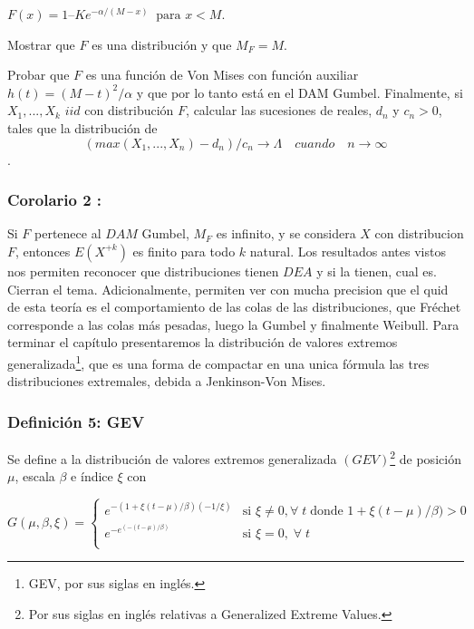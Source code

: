\documentclass[
  oneside]{article}
\begin{document}
\(F(x)= 1 – K e^{-α/(M-x)}\:\text{ para }x<M.\)

Mostrar que \(F\) es una distribución y que \(M_F= M\).

Probar que \(F\) es una función de Von Mises con función auxiliar
\(h(t)= (M-t)^2/ \alpha\) y que por lo tanto está en el DAM Gumbel.
Finalmente, si \(X_1,...,X_k\) \(iid\) con distribución \(F\), calcular
las sucesiones de reales, \(d_n\) y \(c_n>0\), tales que la distribución
de
\[(max(X_1,...,X_n)- d_n)/c_n \longrightarrow \Lambda\quad cuando \quad n\longrightarrow \infty\].

\hypertarget{corolario-2}{%
\subsubsection{Corolario 2 :}\label{corolario-2}}

Si \(F\) pertenece al \(DAM\) Gumbel, \(M_F\) es infinito, y se
considera \(X\) con distribucion \(F\), entonces \(E(X^{+k})\) es finito
para todo \(k\) natural. Los resultados antes vistos nos permiten
reconocer que distribuciones tienen \(DEA\) y si la tienen, cual es.
Cierran el tema. Adicionalmente, permiten ver con mucha precision que el
quid de esta teoría es el comportamiento de las colas de las
distribuciones, que Fréchet corresponde a las colas más pesadas, luego
la Gumbel y finalmente Weibull. Para terminar el capítulo presentaremos
la distribución de valores extremos
generalizada\footnote{GEV, por sus siglas en inglés.}, que es una forma
de compactar en una unica fórmula las tres distribuciones extremales,
debida a Jenkinson-Von Mises.

\hypertarget{definiciuxf3n-5-gev}{%
\subsubsection{Definición 5: GEV}\label{definiciuxf3n-5-gev}}

Se define a la distribución de valores extremos generalizada
\((GEV)\)\footnote{Por sus siglas en inglés relativas a Generalized Extreme Values.}
de posición \(\mu\), escala \(\beta\) e índice \(\xi\) con

\[
G(\mu,\beta,\xi) =
\begin{cases}
    e^{-(1+ \xi(t-\mu)/ \beta)(-1/ \xi)} & \text{si  } \xi \neq 0, \forall\;t\;\text{donde } 1+ \xi(t-\mu)/ \beta) >0 \\
    e^{-e^{(-(t-\mu)/ \beta)}} & \text{si  } \xi =0,\; \forall \;t \\
\end{cases}
\] \vspace{0.5cm}
\end{document}
